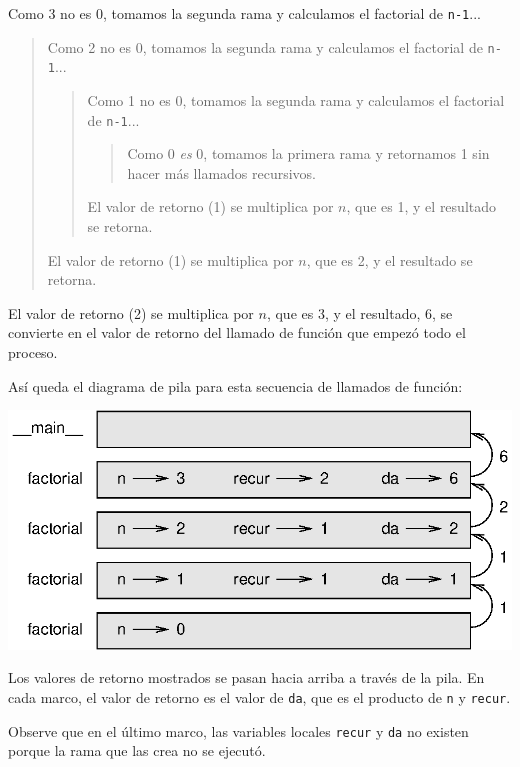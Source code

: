 
Como  3 no es 0, tomamos la segunda rama y calculamos el factorial
de \texttt{n-1}...

\begin{quote}
Como  2 no es 0, tomamos la segunda rama y calculamos el factorial de
\texttt{n-1}...


  \begin{quote}
  Como  1 no es 0, tomamos la segunda rama y calculamos el factorial
  de \texttt{n-1}...


    \begin{quote}
    Como  0 {\em es} 0, tomamos la primera rama y retornamos 1
    sin hacer más llamados recursivos.
    \end{quote}


  El valor de retorno  (1) se multiplica por $n$, que es 1, y el 
  resultado se retorna.
  \end{quote}


El valor de retorno (1) se multiplica por $n$, que es 2, y el 
resultado se retorna.
\end{quote}


El valor de retorno (2) se multiplica por $n$, que es 3, y el resultado, 6,
se convierte en el valor de retorno del llamado de función que empezó todo
el proceso.

Así queda el diagrama de pila para esta secuencia de llamados de función:

\vspace{0.1in}
\beforefig
\centerline{\includegraphics{illustrations/stack3.eps}}
\afterfig
\vspace{0.1in}

Los valores de retorno mostrados se pasan hacia arriba a través de la pila.
En cada marco, el valor de retorno es el valor de  \texttt{da},
 que es el producto de \texttt{n} y \texttt{recur}.

Observe que en el último marco, las variables locales \texttt{recur} y \texttt{da} 
no existen porque la rama que las crea no se ejecutó.


